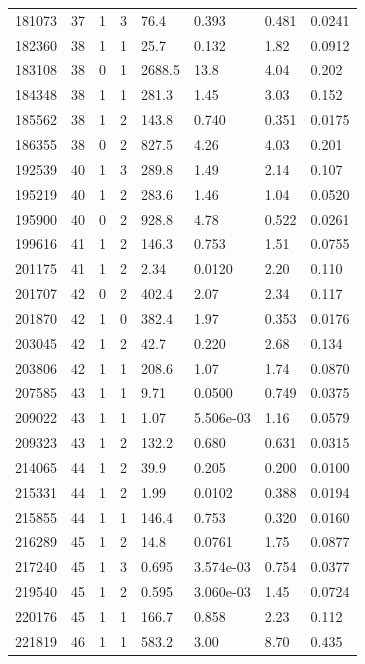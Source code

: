 \documentclass[preview]{standalone}
\begin{document}
{{{{\begin{tabular}{L{1.2cm}C{1.2cm} C{0.3cm}C{0.5cm} C{1.4cm}C{1.4cm} C{1.4cm}C{1.4cm}}
  181073  &    37  & 1     &  3 &  76.4  & 0.393  & 0.481 &  0.0241   \\ 
  182360  &    38  & 1     &  1 &  25.7  & 0.132  & 1.82 &  0.0912   \\ 
  183108  &    38  & 0     &  1 &  2688.5  & 13.8  & 4.04 &  0.202   \\ 
  184348  &    38  & 1     &  1 &  281.3  & 1.45  & 3.03 &  0.152   \\ 
  185562  &    38  & 1     &  2 &  143.8  & 0.740  & 0.351 &  0.0175   \\ 
  186355  &    38  & 0     &  2 &  827.5  & 4.26  & 4.03 &  0.201   \\ 
  192539  &    40  & 1     &  3 &  289.8  & 1.49  & 2.14 &  0.107   \\ 
  195219  &    40  & 1     &  2 &  283.6  & 1.46  & 1.04 &  0.0520   \\ 
  195900  &    40  & 0     &  2 &  928.8  & 4.78  & 0.522 &  0.0261   \\ 
  199616  &    41  & 1     &  2 &  146.3  & 0.753  & 1.51 &  0.0755   \\ 
  201175  &    41  & 1     &  2 &  2.34  & 0.0120  & 2.20 &  0.110   \\ 
  201707  &    42  & 0     &  2 &  402.4  & 2.07  & 2.34 &  0.117   \\ 
  201870  &    42  & 1     &  0 &  382.4  & 1.97  & 0.353 &  0.0176   \\ 
  203045  &    42  & 1     &  2 &  42.7  & 0.220  & 2.68 &  0.134   \\ 
  203806  &    42  & 1     &  1 &  208.6  & 1.07  & 1.74 &  0.0870   \\ 
  207585  &    43  & 1     &  1 &  9.71  & 0.0500  & 0.749 &  0.0375   \\ 
  209022  &    43  & 1     &  1 &  1.07  & 5.506e-03  & 1.16 &  0.0579   \\ 
  209323  &    43  & 1     &  2 &  132.2  & 0.680  & 0.631 &  0.0315   \\ 
  214065  &    44  & 1     &  2 &  39.9  & 0.205  & 0.200 &  0.0100   \\ 
  215331  &    44  & 1     &  2 &  1.99  & 0.0102  & 0.388 &  0.0194   \\ 
  215855  &    44  & 1     &  1 &  146.4  & 0.753  & 0.320 &  0.0160   \\ 
  216289  &    45  & 1     &  2 &  14.8  & 0.0761  & 1.75 &  0.0877   \\ 
  217240  &    45  & 1     &  3 &  0.695  & 3.574e-03  & 0.754 &  0.0377   \\ 
  219540  &    45  & 1     &  2 &  0.595  & 3.060e-03  & 1.45 &  0.0724   \\ 
  220176  &    45  & 1     &  1 &  166.7  & 0.858  & 2.23 &  0.112   \\ 
  221819  &    46  & 1     &  1 &  583.2  & 3.00  & 8.70 &  0.435   \\ 
\hline 
\end{tabular} 

}}}}
\end{document}
